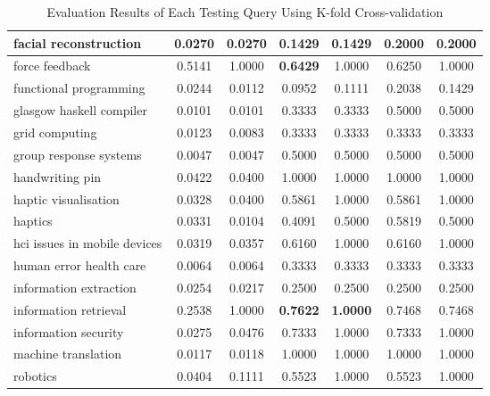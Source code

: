 \begin{table}
{\begin{tabular}{|l|c|c|c|c|c|c|}
\hline facial reconstruction & 0.0270 & 0.0270 & 0.1429 & 0.1429 & 0.2000 & 0.2000 \\
\hline force feedback & 0.5141 & 1.0000 & \textbf{0.6429} & 1.0000 & 0.6250 & 1.0000 \\
\hline functional programming & 0.0244 & 0.0112 & 0.0952 & 0.1111 & 0.2038 & 0.1429 \\
\hline glasgow haskell compiler & 0.0101 & 0.0101 & 0.3333 & 0.3333 & 0.5000 & 0.5000 \\
\hline grid computing & 0.0123 & 0.0083 & 0.3333 & 0.3333 & 0.3333 & 0.3333 \\
\hline group response systems & 0.0047 & 0.0047 & 0.5000 & 0.5000 & 0.5000 & 0.5000 \\
\hline handwriting pin & 0.0422 & 0.0400 & 1.0000 & 1.0000 & 1.0000 & 1.0000 \\
\hline haptic visualisation & 0.0328 & 0.0400 & 0.5861 & 1.0000 & 0.5861 & 1.0000 \\
\hline haptics & 0.0331 & 0.0104 & 0.4091 & 0.5000 & 0.5819 & 0.5000 \\
\hline hci issues in mobile devices & 0.0319 & 0.0357 & 0.6160 & 1.0000 & 0.6160 & 1.0000 \\
\hline human error health care & 0.0064 & 0.0064 & 0.3333 & 0.3333 & 0.3333 & 0.3333 \\
\hline information extraction & 0.0254 & 0.0217 & 0.2500 & 0.2500 & 0.2500 & 0.2500 \\
\hline information retrieval & 0.2538 & 1.0000 & \textbf{0.7622} & \textbf{1.0000} & 0.7468 & 0.7468 \\
\hline information security & 0.0275 & 0.0476 & 0.7333 & 1.0000 & 0.7333 & 1.0000 \\
\hline machine translation & 0.0117 & 0.0118 & 1.0000 & 1.0000 & 1.0000 & 1.0000 \\
\hline robotics & 0.0404 & 0.1111 & 0.5523 & 1.0000 & 0.5523 & 1.0000 \\
\hline
\end{tabular}
}
\caption{Evaluation Results of Each Testing Query Using K-fold Cross-validation} \label{table:kfoldqueryresult}
\end{table}

